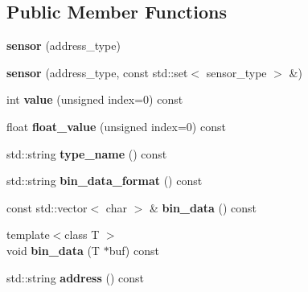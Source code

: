 \subsection*{Public Member Functions}
\begin{DoxyCompactItemize}
\item 
\mbox{\label{classev3dev_1_1sensor_a25cf6df3845eb5a3aa6673462787603e}} 
{\bfseries sensor} (address\+\_\+type)
\item 
\mbox{\label{classev3dev_1_1sensor_a3adf0bf3f9b911248d8a7953b9c5cc3f}} 
{\bfseries sensor} (address\+\_\+type, const std\+::set$<$ sensor\+\_\+type $>$ \&)
\item 
\mbox{\label{classev3dev_1_1sensor_a59666f51a9dc587851b5cdb1cba8ac5d}} 
int {\bfseries value} (unsigned index=0) const
\item 
\mbox{\label{classev3dev_1_1sensor_a0b5c5c620b9187b35f2e7c17e4b6f29e}} 
float {\bfseries float\+\_\+value} (unsigned index=0) const
\item 
\mbox{\label{classev3dev_1_1sensor_aecc238fc9cb62ae81e4f9bc2b119e839}} 
std\+::string {\bfseries type\+\_\+name} () const
\item 
\mbox{\label{classev3dev_1_1sensor_a17a444b74a9b6d610e4e7f1e5ff29713}} 
std\+::string {\bfseries bin\+\_\+data\+\_\+format} () const
\item 
\mbox{\label{classev3dev_1_1sensor_a75739b2dd7fdeb705291699db55a903a}} 
const std\+::vector$<$ char $>$ \& {\bfseries bin\+\_\+data} () const
\item 
\mbox{\label{classev3dev_1_1sensor_a790e6b1ae0492ef8e53d3bef862e08b2}} 
{\footnotesize template$<$class T $>$ }\\void {\bfseries bin\+\_\+data} (T $\ast$buf) const
\item 
\mbox{\label{classev3dev_1_1sensor_acbe383b395b9beabd59112e07e12fee7}} 
std\+::string {\bfseries address} () const
\item 
\mbox{\label{classev3dev_1_1sensor_a5b209dd92d8e9df3563e4831925a40da}} 

\end{DoxyCompactItemize}
